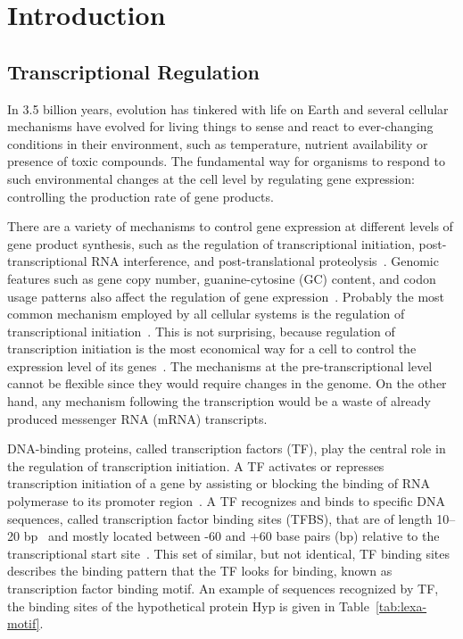 
\chapter{Introduction}

\section{Transcriptional Regulation}

In 3.5 billion years, evolution has tinkered with life on Earth and several
cellular mechanisms have evolved for living things to sense and react to
ever-changing conditions in their environment, such as temperature, nutrient
availability or presence of toxic compounds. The fundamental way for organisms
to respond to such environmental changes at the cell level by regulating
gene expression: controlling the production rate of gene products.

There are a variety of mechanisms to control gene expression at different
levels of gene product synthesis, such as the regulation of transcriptional
initiation, post-transcriptional RNA interference, and post-translational
proteolysis~\cite{snyder2007molecular}. Genomic features such as gene copy
number, guanine-cytosine (GC) content, and codon usage patterns also affect the
regulation of gene expression~\cite{gustafsson2004codon,
  stranger2007relative}. Probably the most common mechanism employed by all
cellular systems is the regulation of transcriptional
initiation~\cite{browning2004regulation}. This is not surprising, because
regulation of transcription initiation is the most economical way for a cell to
control the expression level of its genes~\cite{malacinski2005essentials}. The
mechanisms at the pre-transcriptional level cannot be flexible since they would
require changes in the genome. On the other hand, any mechanism following the
transcription would be a waste of already produced messenger RNA (mRNA)
transcripts.

DNA-binding proteins, called transcription factors (TF), play the central role
in the regulation of transcription initiation. A TF activates or represses
transcription initiation of a gene by assisting or blocking the binding of RNA
polymerase to its promoter region~\cite{reznikoff1985regulation}. A TF
recognizes and binds to specific DNA sequences, called transcription factor
binding sites (TFBS), that are of length 10--20 bp~\cite{gerland2002physical,
  berg2004adaptive} and mostly located between -60 and +60 base pairs (bp)
relative to the transcriptional start site~\cite{collado1991control}. This set
of similar, but not identical, TF binding sites describes the binding pattern
that the TF looks for binding, known as transcription factor binding motif. An
example of sequences recognized by TF, the binding sites of the hypothetical
protein Hyp is given in Table~\ref{tab:lexa-motif}.

